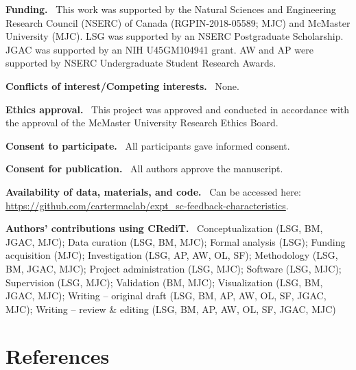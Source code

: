 \documentclass[
  man, donotrepeattitle,floatsintext]{apa7}
\begin{document}
\noindent
\textbf{Funding.} ~This work was supported by the Natural Sciences and Engineering Research Council (NSERC) of Canada (RGPIN-2018-05589; MJC) and McMaster University (MJC). LSG was supported by an NSERC Postgraduate Scholarship. JGAC was supported by an NIH U45GM104941 grant. AW and AP were supported by NSERC Undergraduate Student Research Awards.

\noindent
\textbf{Conflicts of interest/Competing interests.} ~None.

\noindent
\textbf{Ethics approval.} ~This project was approved and conducted in accordance with the approval of the McMaster University Research Ethics Board.

\noindent
\textbf{Consent to participate.} ~All participants gave informed consent.

\noindent
\textbf{Consent for publication.} ~All authors approve the manuscript.

\noindent
\textbf{Availability of data, materials, and code.} ~Can be accessed here: \url{https://github.com/cartermaclab/expt_sc-feedback-characteristics}.

\noindent
\textbf{Authors' contributions using CRediT.} ~Conceptualization (LSG, BM, JGAC, MJC); Data curation (LSG, BM, MJC); Formal analysis (LSG); Funding acquisition (MJC); Investigation (LSG, AP, AW, OL, SF); Methodology (LSG, BM, JGAC, MJC); Project administration (LSG, MJC); Software (LSG, MJC); Supervision (LSG, MJC); Validation (BM, MJC); Visualization (LSG, BM, JGAC, MJC); Writing -- original draft (LSG, BM, AP, AW, OL, SF, JGAC, MJC); Writing -- review \& editing (LSG, BM, AP, AW, OL, SF, JGAC, MJC)

\hypertarget{references}{%
\section{References}\label{references}}

\vspace{2ex}
\end{document}
